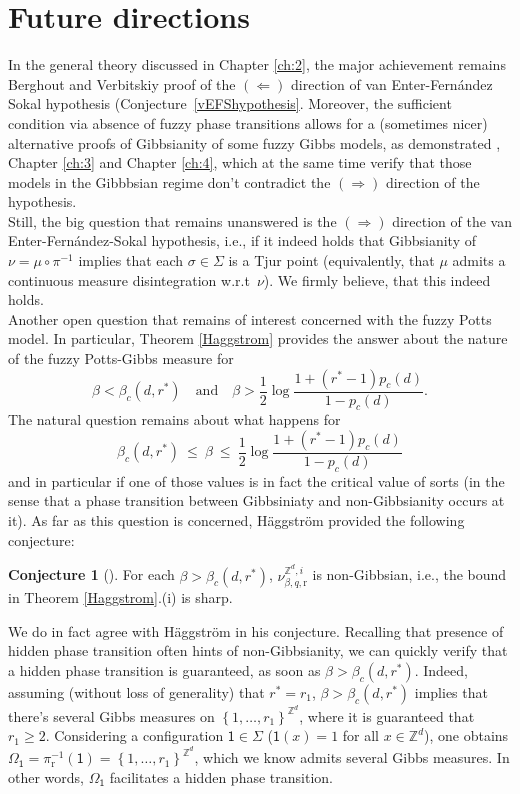 \documentclass[12pt]{article}
\renewcommand{\r}{\mathrm{r}}
\newcommand{\Z}{\mathbb{Z}}
\newcommand{\set}[1]{\left\{#1\right\}}
\newcommand{\1}{\mathbbm{1}}
\newcommand{\5}{\vspace{0.5cm}}
\theoremstyle{definition}
\newtheorem{conj}[thm]{Conjecture}
\begin{document}

\section{Future directions}\label{ch:5}

In the general theory discussed in Chapter \ref{ch:2}, the major achievement remains Berghout and Verbitskiy proof of the $(\Leftarrow)$ direction of van Enter-Fern\'andez Sokal hypothesis (Conjecture~\ref{vEFShypothesis}. Moreover, the sufficient condition via absence of fuzzy phase transitions allows for a (sometimes nicer) alternative proofs of Gibbsianity of some fuzzy Gibbs models, as demonstrated \cite{Gas}, Chapter \ref{ch:3} and Chapter \ref{ch:4}, which at the same time verify that those models in the Gibbbsian regime don't contradict the $(\Rightarrow)$ direction of the hypothesis. \\

Still, the big question that remains unanswered is the $(\Rightarrow)$ direction of the van Enter-Fern\'andez-Sokal hypothesis, i.e., if it indeed holds that Gibbsianity of $\nu=\mu\circ\pi^{-1}$ implies that each $\sigma\in\Sigma$ is a Tjur point (equivalently, that $\mu$ admits a continuous measure disintegration w.r.t~$\nu$). We firmly believe, that this indeed holds. \\

Another open question that remains of interest concerned with the fuzzy Potts model. In particular, Theorem \ref{Haggstrom} provides the answer about the nature of the fuzzy Potts-Gibbs measure for
$$\beta < \beta_c(d,r^*) \quad \text{and} \quad \beta>\frac{1}{2}\log\frac{1+(r^*-1)p_c(d)}{1-p_c(d)}.$$
The natural question remains about what happens for
$$\beta_c(d,r^*) ~\leq~ \beta ~\leq~ \frac{1}{2}\log\frac{1+(r^*-1)p_c(d)}{1-p_c(d)}$$
and in particular if one of those values is in fact the critical value of sorts (in the sense that a phase transition between Gibbsiniaty and non-Gibbsianity occurs at it). As far as this question is concerned, H\"aggstr\"om provided the following conjecture:
\begin{conj}[\cite{Hag}]
For each $\beta>\beta_c(d,r^*)$, $\nu_{\beta,q,\r}^{\Z^d,i}$ is non-Gibbsian, i.e., the bound in Theorem \ref{Haggstrom}.(i) is sharp.
\end{conj}
We do in fact agree with H\"aggstr\"om in his conjecture. Recalling that presence of hidden phase transition often hints of non-Gibbsianity, we can quickly verify that a hidden phase transition is guaranteed, as soon as $\beta>\beta_c(d,r^*)$. Indeed, assuming (without loss of generality) that $r^*=r_1$, $\beta>\beta_c(d,r^*)$ implies that there's several Gibbs measures on $\set{1,\ldots,r_1}^{\Z^d}$, where it is guaranteed that $r_1\geq 2$. Considering a configuration $\mathsf{1}\in\Sigma$ ($\mathsf{1}(x)=1$ for all $x\in\Z^d$), one obtains $\Omega_{\mathsf{1}}=\pi_\r^{-1}(\mathsf{1})=\set{1,\ldots,r_1}^{\Z^d}$, which we know admits several Gibbs measures. In other words, $\Omega_{\mathsf{1}}$ facilitates a hidden phase transition. 
\end{document}
